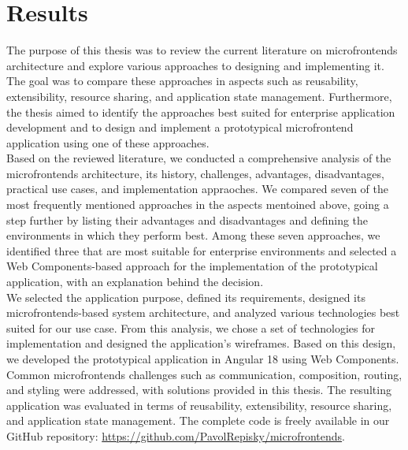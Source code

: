 \section{Results}
The purpose of this thesis was to review the current literature on microfrontends architecture and explore various approaches to designing and implementing it. The goal was to compare these approaches in aspects such as reusability, extensibility, resource sharing, and application state management. Furthermore, the thesis aimed to identify the approaches best suited for enterprise application development and to design and implement a prototypical microfrontend application using one of these approaches. \\

\noindent
Based on the reviewed literature, we conducted a comprehensive analysis of the microfrontends architecture, its history, challenges, advantages, disadvantages, practical use cases, and implementation appraoches. We compared seven of the most frequently mentioned approaches in the aspects mentoined above, going a step further by listing their advantages and disadvantages and defining the environments in which they perform best. Among these seven approaches, we identified three that are most suitable for enterprise environments and selected a Web Components-based approach for the implementation of the prototypical application, with an explanation behind the decision. \\

\noindent
We selected the application purpose, defined its requirements, designed its microfrontends-based system architecture, and analyzed various technologies best suited for our use case. From this analysis, we chose a set of technologies for implementation and designed the application's wireframes. Based on this design, we developed the prototypical application in Angular 18 using Web Components. Common microfrontends challenges such as communication, composition, routing, and styling were addressed, with solutions provided in this thesis. The resulting application was evaluated in terms of reusability, extensibility, resource sharing, and application state management. The complete code is freely available in our GitHub repository: \url{https://github.com/PavolRepisky/microfrontends}. 